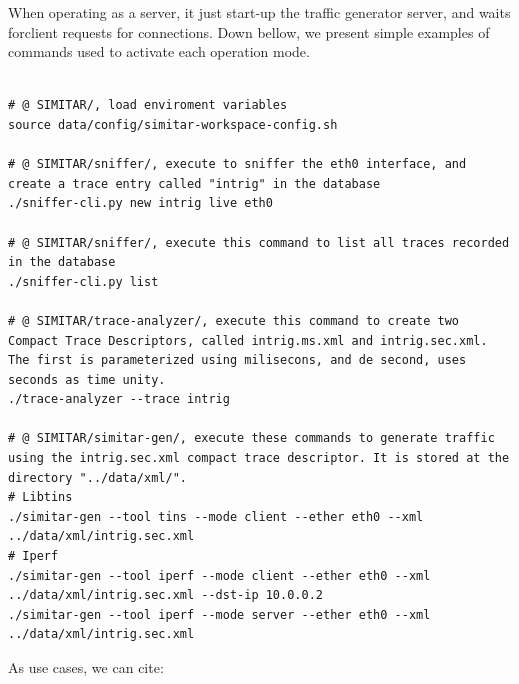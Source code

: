 When operating as a server, it just start-up the traffic generator server, and waits forclient requests for connections. Down bellow, we present simple examples of commands used to activate each operation mode.

\begin{verbatim}

# @ SIMITAR/, load enviroment variables
source data/config/simitar-workspace-config.sh

# @ SIMITAR/sniffer/, execute to sniffer the eth0 interface, and create a trace entry called "intrig" in the database
./sniffer-cli.py new intrig live eth0

# @ SIMITAR/sniffer/, execute this command to list all traces recorded in the database
./sniffer-cli.py list

# @ SIMITAR/trace-analyzer/, execute this command to create two Compact Trace Descriptors, called intrig.ms.xml and intrig.sec.xml. The first is parameterized using milisecons, and de second, uses seconds as time unity.
./trace-analyzer --trace intrig

# @ SIMITAR/simitar-gen/, execute these commands to generate traffic using the intrig.sec.xml compact trace descriptor. It is stored at the directory "../data/xml/". 
# Libtins
./simitar-gen --tool tins --mode client --ether eth0 --xml ../data/xml/intrig.sec.xml 
# Iperf
./simitar-gen --tool iperf --mode client --ether eth0 --xml ../data/xml/intrig.sec.xml --dst-ip 10.0.0.2
./simitar-gen --tool iperf --mode server --ether eth0 --xml ../data/xml/intrig.sec.xml

\end{verbatim}

As use cases, we can cite:

